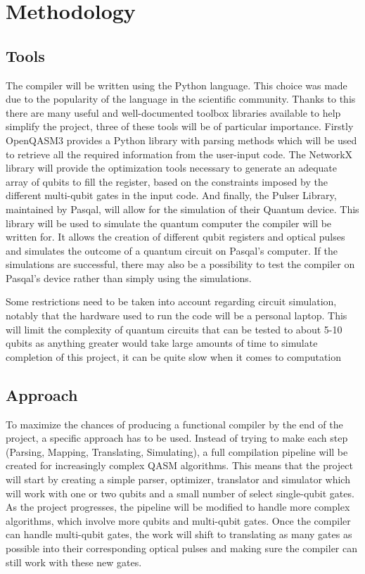 \section{Methodology}
\label{sec:methods}

\subsection{Tools}
\label{sec:Tools}
The compiler will be written using the Python language. This choice was made due to the popularity of the language in 
the scientific community. Thanks to this there are many useful and well-documented toolbox libraries available to help simplify the project,
three of these tools will be of particular importance.
Firstly OpenQASM3 provides a Python library with parsing methods which will be used to retrieve all the required information from the
user-input code. 
The NetworkX library will provide the optimization tools necessary to generate an adequate array 
of qubits to fill the register, based on the constraints imposed by the different multi-qubit gates in the input code.
And finally, the Pulser Library, maintained by Pasqal, will allow for the simulation of their Quantum device. 
This library will be used to simulate the quantum computer the compiler will be written for. It allows the creation of
different qubit registers and optical pulses and simulates the outcome of a quantum circuit on Pasqal's computer.
If the simulations are successful, there may also be a possibility to test the compiler on Pasqal's device rather than simply using the simulations.

Some restrictions need to be taken into account regarding circuit simulation, notably that the hardware used to run the code will be
 a personal laptop. This will limit the complexity of quantum circuits that can be tested to about 5-10 qubits as anything greater
 would take large amounts of time to simulate %
 completion of this project, it can be quite slow when it comes to computation %
\subsection{Approach}
\label{sec:Approach}
To maximize the chances of producing a functional compiler by the end of the project, a specific approach has to be used. Instead of
 trying to make each step (Parsing, Mapping, Translating, Simulating), a full compilation pipeline will be created for increasingly complex 
 QASM algorithms. This means that the project will start by creating a simple parser, optimizer, translator and simulator which will work with
 one or two qubits and a small number of select single-qubit gates. As the project progresses, the pipeline will be modified to handle more complex algorithms, 
 which involve more qubits and multi-qubit gates. Once the compiler can handle multi-qubit gates, the work will shift to translating as many gates as possible 
 into their corresponding optical pulses and making sure the compiler can still work with these new gates.
